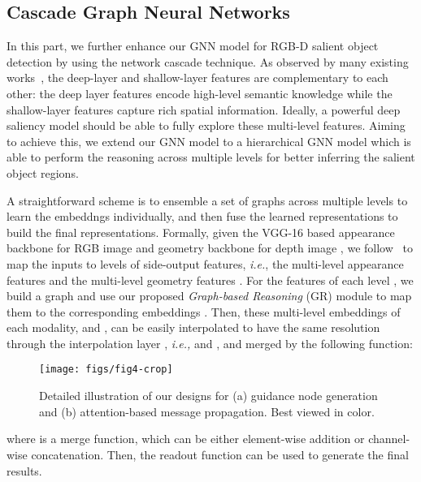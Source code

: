 \documentclass[runningheads]{llncs}
\begin{document}
	\subsection{Cascade Graph Neural Networks}
In this part, we further enhance our GNN model for RGB-D salient object detection by using the network cascade technique. As observed by many existing works~\cite{hou2017deeply,liu2016dhsnet,wang2016saliency,Fan_2020_CVPR}, the deep-layer and shallow-layer features are complementary to each other: the deep layer features encode high-level semantic knowledge while the shallow-layer features capture rich spatial information. Ideally, a powerful deep saliency model should be able to fully explore these multi-level features. Aiming to achieve this, we extend our GNN model to a hierarchical GNN model which is able to perform the reasoning across multiple levels for better inferring the salient object regions. 

A straightforward scheme is to ensemble a set of graphs across multiple levels  to learn the embeddngs individually, and then fuse the learned representations to build the final representations. Formally,  given the VGG-16 based appearance backbone  for RGB image  and geometry backbone  for depth image , we follow~\cite{hou2017deeply} to map the inputs to  levels of side-output features, \emph{i.e.}, the multi-level appearance features  and the multi-level geometry features . For the features of each level , we build a graph  and use our proposed {\em Graph-based Reasoning} (GR) module  to map them to the corresponding embeddings . Then, these multi-level embeddings of each modality,  and , can be easily interpolated to have the same resolution through the interpolation layer , \emph{i.e.,}  and , and merged by the following function:


\begin{figure}[pt]
	\begin{center}
		\texttt{[image: figs/fig4-crop]}
	\end{center}
	\caption{Detailed illustration of our designs for (a) guidance node generation and (b) attention-based message propagation. Best viewed in color. }
	\label{fig:4}
\end{figure}

\noindent where  is a merge function, which can be either element-wise addition or channel-wise concatenation.  Then, the readout function  can be used to generate the final results. 
\end{document}
